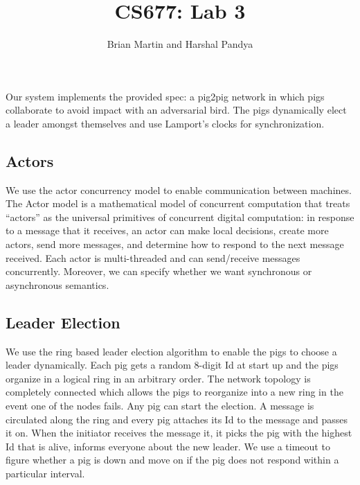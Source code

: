 \documentclass[]{article}
\title{CS677: Lab 3}
\author{Brian Martin and Harshal Pandya}
\date{}
\begin{document}
\maketitle

Our system implements the provided spec: a pig2pig network in which pigs
collaborate to avoid impact with an adversarial bird. The pigs dynamically 
elect a leader amongst themselves and use Lamport's clocks for synchronization. 

\subsection{Actors}
We use the actor concurrency model to enable communication between machines. The
Actor model is a mathematical model of concurrent computation that
treats ``actors'' as the universal primitives of concurrent digital
computation: in response to a message that it receives, an actor can
make local decisions, create more actors, send more messages, and
determine how to respond to the next message received. Each actor is multi-threaded 
and can send/receive messages concurrently. Moreover, we can specify whether we want 
synchronous or asynchronous semantics.

\subsection{Leader Election}
We use the ring based leader election algorithm to enable the pigs to choose a leader dynamically.
Each pig gets a random 8-digit Id at start up and the pigs organize in a logical ring in an arbitrary order.
The network topology is completely connected which allows the pigs to reorganize into a new ring in the
event one of the nodes fails. Any pig can start the election. A message is circulated along the ring and every 
pig attaches its Id to the message and passes it on. When the initiator receives the message it, it picks the 
pig with the highest Id that is alive, informs everyone about the new leader. We use a timeout to figure whether 
a pig is down and move on if the pig does not respond within a particular interval.
\end{document}
